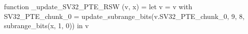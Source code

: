 function _update_SV32_PTE_RSW (v, x) = let v = { v with SV32_PTE_chunk_0 = update_subrange_bits(v.SV32_PTE_chunk_0, 9, 8, subrange_bits(x, 1, 0)) } in
  v
